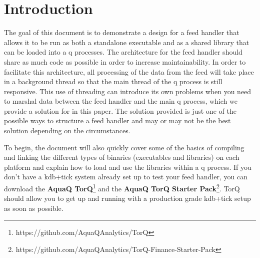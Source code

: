 \chapter{Introduction}

The goal of this document is to demonstrate a design for a feed handler that allows it to be run as both a standalone executable and as a shared library that can be loaded into a q processes. The architecture for the feed handler should share as much code as possible in order to increase maintainability. In order to facilitate this architecture, all processing of the data from the feed will take place in a background thread so that the main thread of the q process is still responsive. This use of threading can introduce its own problems when you need to marshal data between the feed handler and the main q process, which we provide a solution for in this paper. The solution provided is just one of the possible ways to structure a feed handler and may or may
not be the best solution depending on the circumstances.

To begin, the document will also quickly cover some of the basics of compiling and linking
the different types of binaries (executables and libraries) on each platform and explain
how to load and use the libraries within a q process. If you don't have a kdb+tick system
already set up to test your feed handler, you can download the \textbf{AquaQ TorQ}\footnote{https://github.com/AquaQAnalytics/TorQ} and the
\textbf{AquaQ TorQ Starter Pack}\footnote{https://github.com/AquaQAnalytics/TorQ-Finance-Starter-Pack}. TorQ should allow you to get up and
running with a production grade kdb+tick setup as soon as possible.






